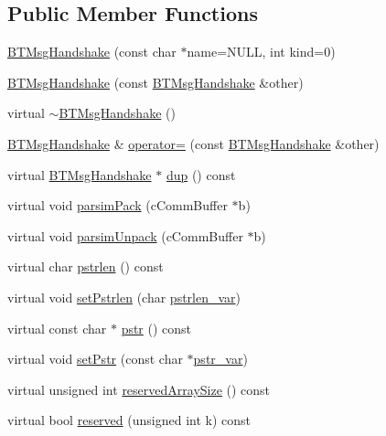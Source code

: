\subsection*{Public Member Functions}
\begin{DoxyCompactItemize}
\item 
\hyperlink{classBTMsgHandshake_a3647388b293bcfe86ee4d3d6978499dd}{B\+T\+Msg\+Handshake} (const char $\ast$name=N\+U\+L\+L, int kind=0)
\item 
\hyperlink{classBTMsgHandshake_aabdd16aad5b8045597daa66ae351da79}{B\+T\+Msg\+Handshake} (const \hyperlink{classBTMsgHandshake}{B\+T\+Msg\+Handshake} \&other)
\item 
virtual \hyperlink{classBTMsgHandshake_a769ddebed475d96a9e98af23442c18a0}{$\sim$\+B\+T\+Msg\+Handshake} ()
\item 
\hyperlink{classBTMsgHandshake}{B\+T\+Msg\+Handshake} \& \hyperlink{classBTMsgHandshake_a31bab774b8a182471abf501acfcedc4a}{operator=} (const \hyperlink{classBTMsgHandshake}{B\+T\+Msg\+Handshake} \&other)
\item 
virtual \hyperlink{classBTMsgHandshake}{B\+T\+Msg\+Handshake} $\ast$ \hyperlink{classBTMsgHandshake_a5dc5693ae117aae06ee66308974c0623}{dup} () const 
\item 
virtual void \hyperlink{classBTMsgHandshake_ad8c48e46aa80079dff589d99fafdc637}{parsim\+Pack} (c\+Comm\+Buffer $\ast$b)
\item 
virtual void \hyperlink{classBTMsgHandshake_afd07f5ee1198c520ba32f9ac9fdfd060}{parsim\+Unpack} (c\+Comm\+Buffer $\ast$b)
\item 
virtual char \hyperlink{classBTMsgHandshake_a25c0d32b72fde124d1b6c57965df964f}{pstrlen} () const 
\item 
virtual void \hyperlink{classBTMsgHandshake_a9b81e33ee9cfe17c04a9dd41214860c5}{set\+Pstrlen} (char \hyperlink{classBTMsgHandshake_aac6817b686487e3646ff1ec8ffe28965}{pstrlen\+\_\+var})
\item 
virtual const char $\ast$ \hyperlink{classBTMsgHandshake_a0b8d1d3f7aabc420d382089767833b5b}{pstr} () const 
\item 
virtual void \hyperlink{classBTMsgHandshake_a2e8a2858b089b1fa12c2bda68f64390a}{set\+Pstr} (const char $\ast$\hyperlink{classBTMsgHandshake_a913d64395dfd4230c77881950871df18}{pstr\+\_\+var})
\item 
virtual unsigned int \hyperlink{classBTMsgHandshake_a2e850e68903d55d95dc64a7c3db48fe4}{reserved\+Array\+Size} () const 
\item 
virtual bool \hyperlink{classBTMsgHandshake_a9c39003dbbd8c136928073e77a51a403}{reserved} (unsigned int k) const 

\end{DoxyCompactItemize}
